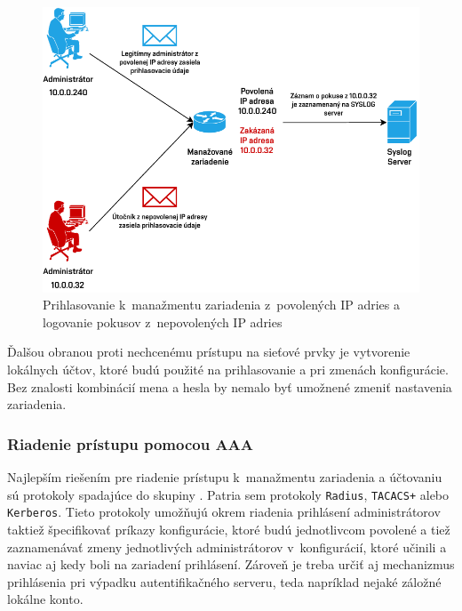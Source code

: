 \begin{figure}[H]
	\begin{center}
		\includegraphics[scale=1]{obrazky/login-log.pdf}
	\end{center}
	\caption[Prihlasovanie k~manažmentu zariadenia z~povolených IP adries a logovanie pokusov z~nepovolených IP adries]{Prihlasovanie k~manažmentu zariadenia z~povolených IP adries a logovanie pokusov z~nepovolených IP adries}
	\label{fig:login-log-mngmt}
\end{figure} 

\newpage
Ďalšou obranou proti nechcenému prístupu na sieťové prvky je vytvorenie lokálnych účtov, ktoré budú použité na prihlasovanie a pri zmenách konfigurácie. Bez znalosti kombinácií mena a hesla by nemalo byť umožnené zmeniť nastavenia zariadenia.  

\subsubsection{Riadenie prístupu pomocou AAA}
Najlepším riešením pre riadenie prístupu k~manažmentu zariadenia a účtovaniu sú protokoly spadajúce do skupiny . Patria sem protokoly \texttt{Radius}, \texttt{TACACS+} alebo \texttt{Kerberos}. Tieto protokoly umožňujú okrem riadenia prihlásení administrátorov taktiež špecifikovať príkazy konfigurácie, ktoré budú jednotlivcom povolené a tiež zaznamenávať zmeny jednotlivých administrátorov v~konfigurácií, ktoré učinili a naviac aj kedy boli na zariadení prihlásení. Zároveň je treba určiť aj mechanizmus prihlásenia pri výpadku autentifikačného serveru, teda napríklad nejaké záložné lokálne konto.

